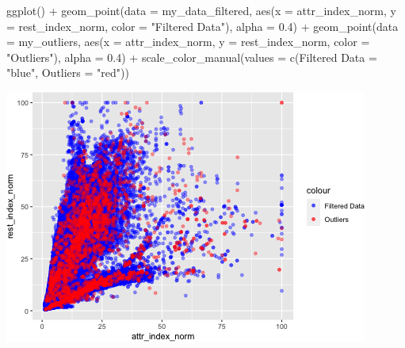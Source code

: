 \documentclass[
]{article}
\newenvironment{Shaded}{\begin{snugshade}}{\end{snugshade}}
\newcommand{\AttributeTok}[1]{\textcolor[rgb]{0.77,0.63,0.00}{#1}}
\newcommand{\FloatTok}[1]{\textcolor[rgb]{0.00,0.00,0.81}{#1}}
\newcommand{\FunctionTok}[1]{\textcolor[rgb]{0.00,0.00,0.00}{#1}}
\newcommand{\NormalTok}[1]{#1}
\newcommand{\OtherTok}[1]{\textcolor[rgb]{0.56,0.35,0.01}{#1}}
\newcommand{\SpecialCharTok}[1]{\textcolor[rgb]{0.00,0.00,0.00}{#1}}
\newcommand{\StringTok}[1]{\textcolor[rgb]{0.31,0.60,0.02}{#1}}
\begin{document}
\begin{Shaded}
\begin{Highlighting}[]
\FunctionTok{ggplot}\NormalTok{() }\SpecialCharTok{+} \FunctionTok{geom\_point}\NormalTok{(}\AttributeTok{data =}\NormalTok{ my\_data\_filtered, }\FunctionTok{aes}\NormalTok{(}\AttributeTok{x =}\NormalTok{ attr\_index\_norm,}
    \AttributeTok{y =}\NormalTok{ rest\_index\_norm, }\AttributeTok{color =} \StringTok{"Filtered Data"}\NormalTok{), }\AttributeTok{alpha =} \FloatTok{0.4}\NormalTok{) }\SpecialCharTok{+}
    \FunctionTok{geom\_point}\NormalTok{(}\AttributeTok{data =}\NormalTok{ my\_outliers, }\FunctionTok{aes}\NormalTok{(}\AttributeTok{x =}\NormalTok{ attr\_index\_norm, }\AttributeTok{y =}\NormalTok{ rest\_index\_norm,}
        \AttributeTok{color =} \StringTok{"Outliers"}\NormalTok{), }\AttributeTok{alpha =} \FloatTok{0.4}\NormalTok{) }\SpecialCharTok{+} \FunctionTok{scale\_color\_manual}\NormalTok{(}\AttributeTok{values =} \FunctionTok{c}\NormalTok{(}\StringTok{\textasciigrave{}}\AttributeTok{Filtered Data}\StringTok{\textasciigrave{}} \OtherTok{=} \StringTok{"blue"}\NormalTok{,}
    \AttributeTok{Outliers =} \StringTok{"red"}\NormalTok{))}
\end{Highlighting}
\end{Shaded}

\includegraphics{Project_files/figure-latex/unnamed-chunk-34-1.png}
\end{document}
